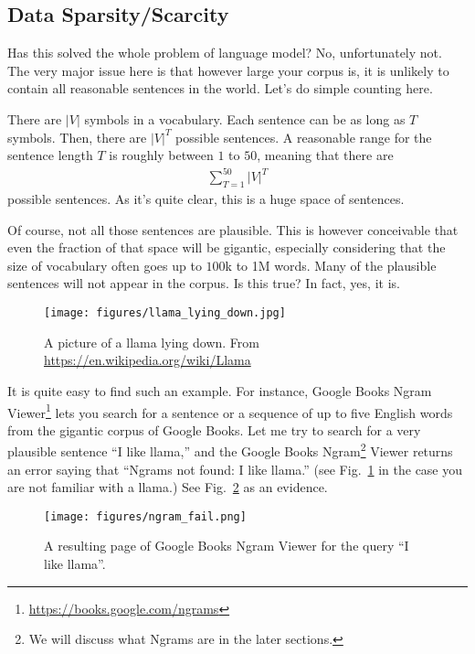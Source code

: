 \documentclass{report}
\begin{document}
\subsection{Data Sparsity/Scarcity}
\label{sec:data_sparsity}

Has this solved the whole problem of language model? No, unfortunately not. The
very major issue here is that however large your corpus is, it is unlikely to
contain all reasonable sentences in the world. Let's do simple counting here.

There are $|V|$ symbols in a vocabulary. Each sentence can be as long as $T$
symbols. Then, there are $|V|^T$ possible sentences. A reasonable range for the
sentence length $T$ is roughly between $1$ to $50$, meaning that there are
\begin{align*}
    \sum_{T=1}^{50} |V|^T
\end{align*}
possible sentences. As it's quite clear, this is a huge space of sentences.

Of course, not all those sentences are plausible. This is however conceivable
that even the fraction of that space will be gigantic, especially considering
that the size of vocabulary often goes up to $100$k to 1M words. Many of the
plausible sentences will not appear in the corpus. Is this true? In fact, yes,
it is. 

\begin{figure}[ht]
    \centering
    \texttt{[image: figures/llama\_lying\_down.jpg]}
    \caption{A picture of a llama lying down. From
    \url{https://en.wikipedia.org/wiki/Llama}}
    \label{fig:llama}
\end{figure}

It is quite easy to find such an example. For instance, Google Books Ngram
Viewer\footnote{
    \url{https://books.google.com/ngrams}
}
lets you search for a sentence or a sequence of up to five English words from
the gigantic corpus of Google Books. Let me try to search for a very plausible
sentence ``I like llama,'' and the Google Books Ngram\footnote{
    We will discuss what Ngrams are in the later sections.
} 
Viewer returns an error
saying that ``Ngrams not found: I like llama.'' (see Fig.~\ref{fig:llama} in the case you
are not familiar with a llama.) See Fig.~\ref{fig:ngram_fail} as an evidence.

\begin{figure}[ht]
    \centering
    \texttt{[image: figures/ngram\_fail.png]}
    \caption{A resulting page of Google Books Ngram Viewer for the query ``I
    like llama''.}
    \label{fig:ngram_fail}
\end{figure}
\end{document}
